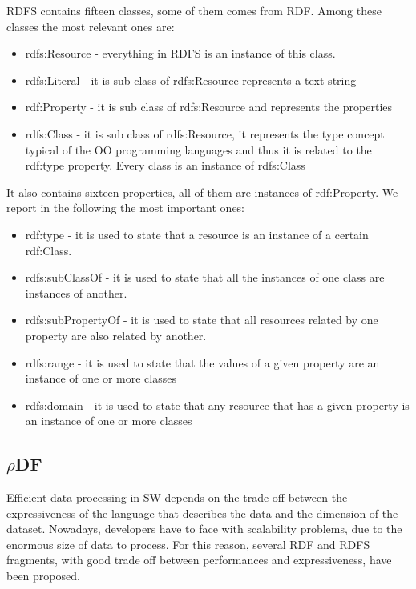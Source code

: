 RDFS contains fifteen classes, some of them comes from RDF. Among these classes the most relevant ones are:

\begin{itemize}
\item rdfs:Resource - everything in RDFS is an instance of this class.
\item rdfs:Literal  -  it is sub class of rdfs:Resource represents a text string
\item rdf:Property  -  it is sub class of rdfs:Resource and represents the properties
\item rdfs:Class    -   it is sub class of rdfs:Resource, it represents the type concept typical of the OO programming languages and thus it is related to the rdf:type property. Every class is an instance of rdfs:Class
\end{itemize}

It also contains sixteen properties, all of them are instances of rdf:Property. We report in the following the most important ones:
\begin{itemize}
\item rdf:type - it is used to state that a resource is an instance of a certain rdf:Class.
\item rdfs:subClassOf - it is used to state that all the instances of one class are instances of another.
\item rdfs:subPropertyOf - it is used to state that all resources related by one property are also related by another.
\item rdfs:range - it is used to state that the values of a given property are an instance of one or more classes
\item rdfs:domain - it is used to state that any resource that has a given property is an instance of one or more classes
\end{itemize}


\subsection{$\rho$DF}\label{sec:rhodf}

Efficient data processing in SW depends on the trade off between the expressiveness of the language that describes the data and the dimension of the dataset. Nowadays, developers have to face with scalability problems, due to the enormous size of data to process. For this reason, several RDF and RDFS fragments, with good trade off between performances and expressiveness, have been proposed.

